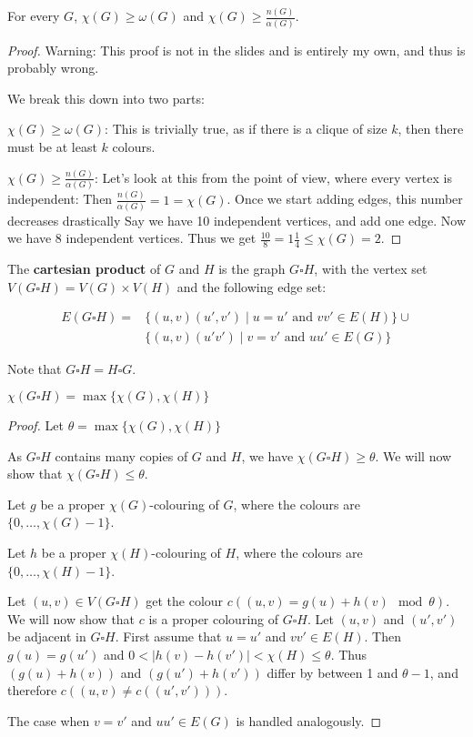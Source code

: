 \begin{proposition}
	For every $G$, $\chi (G) \ge \omega (G)$ and $\chi (G)\ge \frac{n(G)}{\alpha(G)}$.
\end{proposition}

\begin{proof}
	Warning: This proof is not in the slides and is entirely my own, and thus is probably wrong.

	We break this down into two parts:

	$\chi(G) \ge \omega (G)$: This is trivially true, as if there is a clique of size $k$, then there must be at least $k$ colours.

	$\chi (G) \ge \frac{n(G)}{\alpha(G)}$: Let's look at this from the point of view, where every vertex is independent: Then $\frac{n(G)}{\alpha(G)} = 1 = \chi (G)$. Once we start adding edges, this number decreases drastically Say we have 10 independent vertices, and add one edge. Now we have 8 independent vertices. Thus we get $\frac{10}{8} = 1 \frac{1}{4} \le \chi (G) = 2$.
\end{proof}


The \textbf{cartesian product} of $G$ and $H$ is the graph $G \square H$, with the vertex set $V(G \square H) = V(G) \times V(H)$ and the following edge set:

\begin{align*}
	E(G \square H) = & \{(u,v)(u',v') \mid u = u' \text{ and } vv' \in E(H)\} \cup \\
	                 & \{(u,v)(u'v') \mid v = v' \text{ and } uu' \in E(G)\}
\end{align*}

Note that $G \square H = H \square G$.

\begin{proposition}
	$\chi (G \square H) = \max\{\chi (G) , \chi (H)\}$
\end{proposition}

\begin{proof}
	Let $\theta = \max\{\chi(G), \chi(H)\}$

	As $G \square H$ contains many copies of $G$ and $H$, we have $\chi (G \square H) \ge \theta$. We will now show that $\chi (G \square H) \le \theta$.

	Let $g$ be a proper $\chi (G)$-colouring of $G$, where the colours are $\{0, \ldots, \chi(G)-1\}$.

	Let $h$ be a proper $\chi(H)$-colouring of $H$, where the colours are $\{0, \ldots, \chi(H)-1\}$.

	Let $(u,v) \in V(G \square H)$ get the colour $c((u,v) = g(u) + h(v) \mod \theta)$. We will now show that $c$ is a proper colouring of $G \square H$. Let $(u,v)$ and $(u', v')$ be adjacent in $G \square H$. First assume that $u = u'$ and $vv' \in E(H)$. Then $g(u) = g(u')$ and $0 < |h(v) - h(v')| < \chi (H) \le \theta$. Thus $(g(u)+h(v))$ and $(g(u') + h(v'))$ differ by between 1 and \(\theta -1\), and therefore $c((u,v) \ne c((u',v')))$.

	The case when $v = v'$ and $uu' \in E(G)$ is handled analogously.
\end{proof}


